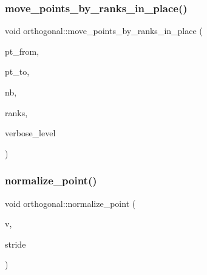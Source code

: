 \mbox{\label{classorthogonal_a82fac7f7528e41392b5fe89860d4204d}} 
\subsubsection{\texorpdfstring{move\+\_\+points\+\_\+by\+\_\+ranks\+\_\+in\+\_\+place()}{move\_points\_by\_ranks\_in\_place()}}
{\footnotesize\ttfamily void orthogonal\+::move\+\_\+points\+\_\+by\+\_\+ranks\+\_\+in\+\_\+place (\begin{DoxyParamCaption}\item[{\mbox{\hyperlink{galois_8h_a09fddde158a3a20bd2dcadb609de11dc}{I\+NT}}}]{pt\+\_\+from,  }\item[{\mbox{\hyperlink{galois_8h_a09fddde158a3a20bd2dcadb609de11dc}{I\+NT}}}]{pt\+\_\+to,  }\item[{\mbox{\hyperlink{galois_8h_a09fddde158a3a20bd2dcadb609de11dc}{I\+NT}}}]{nb,  }\item[{\mbox{\hyperlink{galois_8h_a09fddde158a3a20bd2dcadb609de11dc}{I\+NT}} $\ast$}]{ranks,  }\item[{\mbox{\hyperlink{galois_8h_a09fddde158a3a20bd2dcadb609de11dc}{I\+NT}}}]{verbose\+\_\+level }\end{DoxyParamCaption})}

\mbox{\label{classorthogonal_a1f3776fdc50b810a0a0fcee692fb154f}} 
\subsubsection{\texorpdfstring{normalize\+\_\+point()}{normalize\_point()}}
{\footnotesize\ttfamily void orthogonal\+::normalize\+\_\+point (\begin{DoxyParamCaption}\item[{\mbox{\hyperlink{galois_8h_a09fddde158a3a20bd2dcadb609de11dc}{I\+NT}} $\ast$}]{v,  }\item[{\mbox{\hyperlink{galois_8h_a09fddde158a3a20bd2dcadb609de11dc}{I\+NT}}}]{stride }\end{DoxyParamCaption})}

